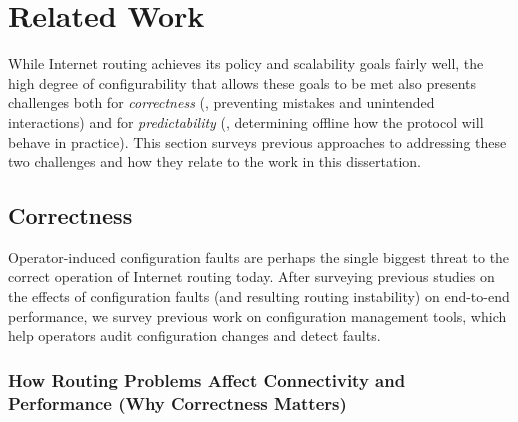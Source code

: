 
\section{Related Work}\label{sec:rw_challenges}


While Internet routing achieves its policy and scalability goals fairly
well, the high 
degree of configurability that allows these goals to be met also
presents challenges both for {\em correctness} (\ie, preventing mistakes
and unintended interactions) and for {\em predictability} (\ie,
determining offline how the protocol will behave in practice).  This
section surveys previous approaches to addressing these two challenges
and how they relate to the work in this dissertation.

\subsection{Correctness}
\label{sec:rcc_related}

Operator-induced configuration faults are perhaps the single biggest
threat to the correct operation of Internet routing today.
After surveying previous
studies on the effects of configuration faults (and resulting
routing instability) on end-to-end performance, we survey previous work
on configuration management tools, which help operators audit
configuration changes and detect faults.

\subsubsection{How Routing Problems Affect Connectivity and Performance
(Why Correctness Matters)} 

